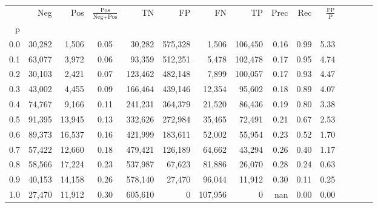 \begin{tabular}{rrrcrrrrrrrrrrr}
\toprule
{} &     Neg &     Pos & $\frac{\text{Pos}}{\text{Neg}+\text{Pos}}$ &       TN &       FP &       FN &       TP &  Prec &   Rec & $\frac{\text{FP}}{\text{P}}$ \\
p   &         &         &                                            &          &          &          &          &       &       &                              \\
\midrule
0.0 &  30,282 &   1,506 &                                       0.05 &   30,282 &  575,328 &    1,506 &  106,450 &  0.16 &  0.99 &                         5.33 \\
0.1 &  63,077 &   3,972 &                                       0.06 &   93,359 &  512,251 &    5,478 &  102,478 &  0.17 &  0.95 &                         4.74 \\
0.2 &  30,103 &   2,421 &                                       0.07 &  123,462 &  482,148 &    7,899 &  100,057 &  0.17 &  0.93 &                         4.47 \\
0.3 &  43,002 &   4,455 &                                       0.09 &  166,464 &  439,146 &   12,354 &   95,602 &  0.18 &  0.89 &                         4.07 \\
0.4 &  74,767 &   9,166 &                                       0.11 &  241,231 &  364,379 &   21,520 &   86,436 &  0.19 &  0.80 &                         3.38 \\
0.5 &  91,395 &  13,945 &                                       0.13 &  332,626 &  272,984 &   35,465 &   72,491 &  0.21 &  0.67 &                         2.53 \\
0.6 &  89,373 &  16,537 &                                       0.16 &  421,999 &  183,611 &   52,002 &   55,954 &  0.23 &  0.52 &                         1.70 \\
0.7 &  57,422 &  12,660 &                                       0.18 &  479,421 &  126,189 &   64,662 &   43,294 &  0.26 &  0.40 &                         1.17 \\
0.8 &  58,566 &  17,224 &                                       0.23 &  537,987 &   67,623 &   81,886 &   26,070 &  0.28 &  0.24 &                         0.63 \\
0.9 &  40,153 &  14,158 &                                       0.26 &  578,140 &   27,470 &   96,044 &   11,912 &  0.30 &  0.11 &                         0.25 \\
1.0 &  27,470 &  11,912 &                                       0.30 &  605,610 &        0 &  107,956 &        0 &   nan &  0.00 &                         0.00 \\
\bottomrule
\end{tabular}

